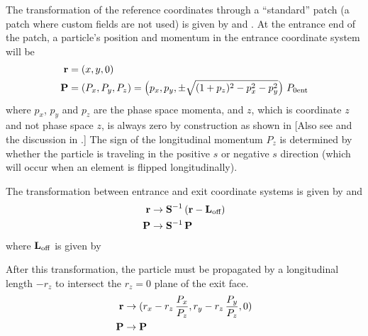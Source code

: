 
The transformation of the reference coordinates through a ``standard'' patch (a patch where custom
fields are not used) is given by  and . At the entrance end of the patch, a
particle's position and momentum in the entrance coordinate system will be
\begin{alignat}{1}
  {\bf r} &= (x, y, 0) \nonumber \\
  {\bf P} &= (P_x, P_y, P_z) = 
    \left( p_x, p_y, \pm \sqrt{(1+p_z)^2 - p_x^2 - p_y^2} \right) \, P_{0\text{ent}}
\end{alignat}
where $p_x$, $p_y$ and $p_z$ are the phase space momenta, and $z$, which is coordinate $z$ and not
phase space $z$, is always zero by construction as shown in  [Also see
 and the discussion in .] The sign of the longitudinal
momentum $P_z$ is determined by whether the particle is traveling in the positive $s$ or negative
$s$ direction (which will occur when an element is flipped longitudinally).

The transformation between entrance and exit coordinate systems is given by  and 
\begin{alignat}{1}
  {\bf r} &\rightarrow 
    {\bf S}^{-1} \, ({\bf r} - {\bf L}_\text{off}) \nonumber \\
  {\bf P} &\rightarrow {\bf S}^{-1} \, {\bf P}
\end{alignat}
where ${\bf L}_\text{off}$ is given by 

After this transformation, the particle must be propagated by a longitudinal length
$-r_z$ to intersect the $r_z = 0$ plane of the exit face.
\begin{alignat}{1}
  {\bf r} &\rightarrow (r_x - r_z \, \frac{P_x}{P_z}, r_y - r_z \, \frac{P_y}{P_z}, 0) \nonumber \\
  {\bf P} &\rightarrow {\bf P}
\end{alignat}


